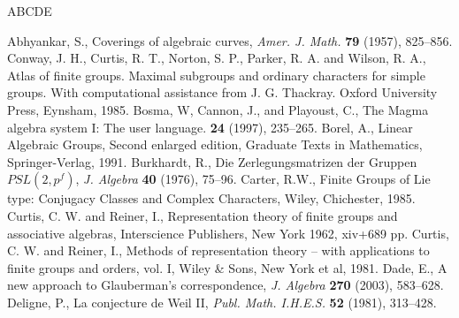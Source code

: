 \documentclass[11pt]{amsart}
\theoremstyle{plain}
\theoremstyle{definition}
\numberwithin{thm}{section}
\numberwithin{equation}{thm}
\newcommand{\0}{\emptyset}
\begin{document}
\begin{thebibliography}{ABCDE}


Abhyankar, S., Coverings of algebraic curves, {\it Amer. J. Math.} {\bf 79} (1957), 825--856.
\medskip
{} Conway, J. H.,  Curtis, R. T.,  Norton, S. P.,  Parker, R. A. and 
 Wilson, R. A.,  Atlas of finite groups. Maximal subgroups and ordinary characters for simple groups. With computational assistance from J. G. Thackray. Oxford University Press, Eynsham, 1985.
\medskip
{}
   Bosma, W, Cannon, J.,  and Playoust, C.,
\newblock The  Magma algebra system I: The user language.
 {\bf 24} (1997), 235--265.  
\medskip
{}
Borel, A., Linear Algebraic Groups, Second enlarged edition, Graduate Texts in Mathematics, Springer-Verlag, 1991. 
\medskip
{}
  Burkhardt, R., Die Zerlegungsmatrizen der Gruppen $PSL(2,p^{f})$, {\it J.
Algebra} {\bf 40} (1976), 75--96.
\medskip
{}
  Carter, R.W.,  Finite Groups of Lie type: Conjugacy Classes
and Complex Characters, Wiley, Chichester, 1985.
\medskip
{}Curtis, C. W. and Reiner, I., Representation theory of finite groups and associative algebras,
Interscience Publishers, New York 1962, xiv+689 pp.
\medskip
{}Curtis, C. W. and Reiner, I., Methods of representation theory -- with applications to finite groups and orders, vol. I, 
Wiley \& Sons, New York et al, 1981.
\medskip
{}
  Dade, E., A new approach to Glauberman's correspondence, {\it J. Algebra} {\bf 270} (2003), 583--628. 
\medskip
{}Deligne, P., La conjecture de Weil II, {\it Publ. Math. I.H.E.S.} {\bf 52} (1981), 313--428.

\end{thebibliography}
\end{document}
